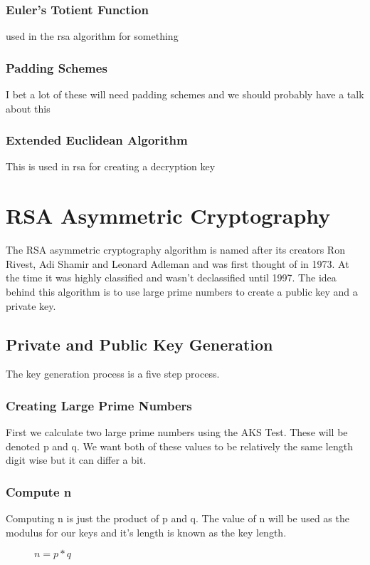 \documentclass[conference]{IEEEtran}
\begin{document}
\subsubsection{Euler's Totient Function}
used in the rsa algorithm for something

\subsubsection{Padding Schemes}
I bet a lot of these will need padding schemes and we should probably have a talk about this


\subsubsection{Extended Euclidean Algorithm}
This is used in rsa for creating a decryption key


\section{RSA Asymmetric Cryptography}

The RSA asymmetric cryptography algorithm is named after its creators Ron Rivest, Adi Shamir and Leonard Adleman and was first thought of in 1973. 
At the time it was highly classified and wasn't declassified until 1997.
The idea behind this algorithm is to use large prime numbers to create a public key and a private key. 
\subsection{Private and Public Key Generation}
The key generation process is a five step process. 

\subsubsection{Creating Large Prime Numbers}
First we calculate two large prime numbers using the AKS Test. These will be denoted p and q. We want both of these values to be relatively the same length digit wise but it can differ a bit. 

\subsubsection{Compute n}
Computing n is just the product of p and q. The value of n will be used as the modulus for our keys and it's length is known as the key length.

\begin{figure}[h]
	\begin{center}
		$n=p * q$
	\end{center}
\end{figure}
\end{document}
